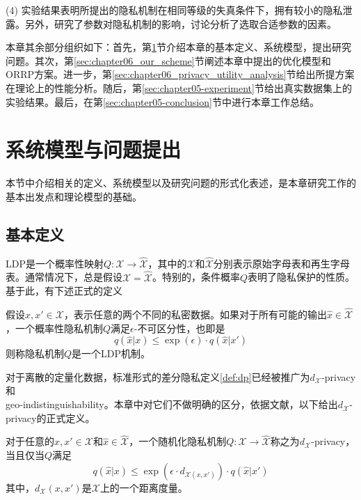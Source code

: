 (4) 实验结果表明所提出的隐私机制在相同等级的失真条件下，拥有较小的隐私泄露。另外，研究了参数对隐私机制的影响，讨论分析了选取合适参数的因素。

本章其余部分组织如下：首先，第\ref{sec:chapter06_system_model}节介绍本章的基本定义、系统模型，提出研究问题。其次，第\ref{sec:chapter06_our_scheme}节阐述本章中提出的优化模型和ORRP方案。进一步，第\ref{sec:chapter06_privacy_utility_analysis}节给出所提方案在理论上的性能分析。随后，第\ref{sec:chapter05-experiment}节给出真实数据集上的实验结果。最后，在第\ref{sec:chapter05-conclusion}节中进行本章工作总结。

\section{系统模型与问题提出}\label{sec:chapter06_system_model}

本节中介绍相关的定义、系统模型以及研究问题的形式化表述，是本章研究工作的基本出发点和理论模型的基础。

\subsection{基本定义}\label{sec:chapter06_basic_definitions}

LDP\cite{duchi2013local}是一个概率性映射$Q:\mathcal{X}\rightarrow \hat{\mathcal{X}}$，其中的$\mathcal{X}$和$\hat{\mathcal{X}}$分别表示原始字母表和再生字母表。通常情况下，总是假设$\mathcal{X}=\hat{\mathcal{X}}$。特别的，条件概率$Q$表明了隐私保护的性质。基于此，有下述正式的定义\cite{kasiviswanathan2011what}
\begin{definition}\label{def:chapter06_LDP}
	假设$x,x' \in \mathcal{X}$，表示任意的两个不同的私密数据。如果对于所有可能的输出$\hat{x} \in \hat{\mathcal{X}}$，一个概率性隐私机制$Q$满足$\epsilon$-不可区分性，也即是
	\begin{equation}
		q(\hat{x}|x) \leq \exp(\epsilon)\cdot q(\hat{x}|x')
	\end{equation}
则称隐私机制$Q$是一个LDP机制。
\end{definition}

对于离散的定量化数据，标准形式的差分隐私定义\ref{def:dp}已经被推广为$d_{\mathcal{X}}$-privacy\cite{chatzikokolakis2013broadening}和\\geo-indistinguishability\cite{andres2013geo,bordenabe2014optimal}。本章中对它们不做明确的区分，依据文献，以下给出$d_{\mathcal{X}}$-privacy的正式定义。

\begin{definition}\label{def:chapter06_d-privacy}
	对于任意的$x,x' \in \mathcal{X}$和$\hat{x} \in \hat{\mathcal{X}}$，一个随机化隐私机制$Q:\mathcal{X}\rightarrow \hat{\mathcal{X}}$称之为$d_{\mathcal{X}}$-privacy，当且仅当$Q$满足
	\begin{equation}
	q(\hat{x}|x) \leq \exp(\epsilon \cdot d_{\mathcal{X}(x,x')}) \cdot q(\hat{x}|x')
	\end{equation}
其中，$d_{\mathcal{X}}(x,x')$是$\mathcal{X}$上的一个距离度量。
\end{definition}

